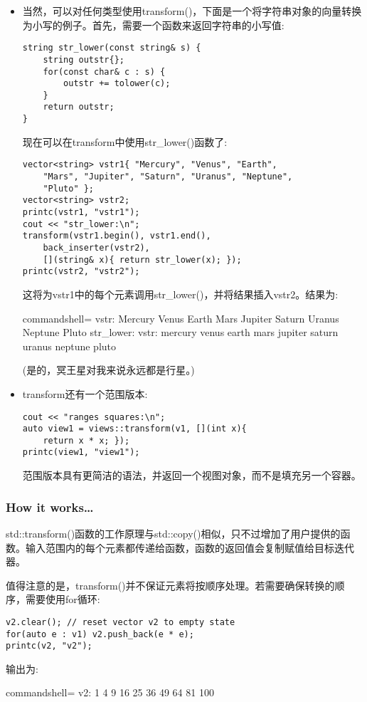 \begin{itemize}
\item 
当然，可以对任何类型使用transform()，下面是一个将字符串对象的向量转换为小写的例子。首先，需要一个函数来返回字符串的小写值:

\begin{lstlisting}[style=styleCXX]
string str_lower(const string& s) {
	string outstr{};
	for(const char& c : s) {
		outstr += tolower(c);
	}
	return outstr;
}
\end{lstlisting}

现在可以在transform中使用str\_lower()函数了:

\begin{lstlisting}[style=styleCXX]
vector<string> vstr1{ "Mercury", "Venus", "Earth",
	"Mars", "Jupiter", "Saturn", "Uranus", "Neptune",
	"Pluto" };
vector<string> vstr2;
printc(vstr1, "vstr1");
cout << "str_lower:\n";
transform(vstr1.begin(), vstr1.end(),
	back_inserter(vstr2),
	[](string& x){ return str_lower(x); });
printc(vstr2, "vstr2");
\end{lstlisting}

这将为vstr1中的每个元素调用str\_lower()，并将结果插入vstr2。结果为:

\begin{tcblisting}{commandshell={}}
vstr: Mercury Venus Earth Mars Jupiter Saturn Uranus
Neptune Pluto
str_lower:
vstr: mercury venus earth mars jupiter saturn uranus
neptune pluto
\end{tcblisting}

(是的，冥王星对我来说永远都是行星。)

\item 
transform还有一个范围版本:

\begin{lstlisting}[style=styleCXX]
cout << "ranges squares:\n";
auto view1 = views::transform(v1, [](int x){
	return x * x; });
printc(view1, "view1");
\end{lstlisting}

范围版本具有更简洁的语法，并返回一个视图对象，而不是填充另一个容器。
\end{itemize}

\subsubsection{How it works…}

std::transform()函数的工作原理与std::copy()相似，只不过增加了用户提供的函数。输入范围内的每个元素都传递给函数，函数的返回值会复制赋值给目标迭代器。

值得注意的是，transform()并不保证元素将按顺序处理。若需要确保转换的顺序，需要使用for循环:

\begin{lstlisting}[style=styleCXX]
v2.clear(); // reset vector v2 to empty state
for(auto e : v1) v2.push_back(e * e);
printc(v2, "v2");
\end{lstlisting}

输出为:

\begin{tcblisting}{commandshell={}}
v2: 1 4 9 16 25 36 49 64 81 100
\end{tcblisting}

















